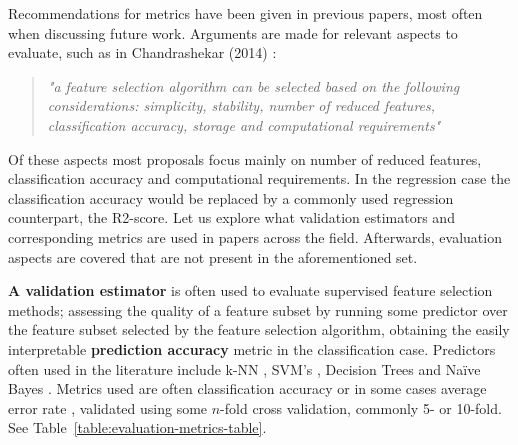 \documentclass{article}
\begin{document}
Recommendations for metrics have been given in previous papers, most often when discussing future work. Arguments are made for relevant aspects to evaluate, such as in Chandrashekar (2014) \citep{chandrashekar_survey_2014}:

\begin{quote}\textit{"a feature selection algorithm can be selected based on the following considerations: simplicity, stability, number of reduced features, classification accuracy, storage and computational requirements"}\end{quote}

Of these aspects most proposals focus mainly on number of reduced features, classification accuracy and computational requirements. In the regression case the classification accuracy would be replaced by a commonly used regression counterpart, the R2-score. Let us explore what validation estimators and corresponding metrics are used in papers across the field. Afterwards, evaluation aspects are covered that are not present in the aforementioned set.

\textbf{A validation estimator} is often used to evaluate supervised feature selection methods; assessing the quality of a feature subset by running some predictor over the feature subset selected by the feature selection algorithm, obtaining the easily interpretable \textbf{prediction accuracy} metric in the classification case. Predictors often used in the literature include k-NN \citep{al-tashi_review_2020} \citep{mafarja_dragonfly_2020}, SVM's \citep{chandrashekar_survey_2014}, Decision Trees \citep{li_feature_2017} and Naïve Bayes \citep{koller_toward_1996}. Metrics used are often classification accuracy or in some cases average error rate \citep{khurma_evolopy-fs_2020}, validated using some $n$-fold cross validation, commonly 5- or 10-fold. See Table~\ref{table:evaluation-metrics-table}.
\end{document}
